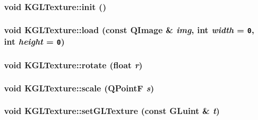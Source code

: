 \hypertarget{class_k_g_l_texture_8ce2976f7a178e059436696412b58d24}{
\subsubsection[{init}]{\setlength{\rightskip}{0pt plus 5cm}void KGLTexture::init ()}}
\label{class_k_g_l_texture_8ce2976f7a178e059436696412b58d24}


\hypertarget{class_k_g_l_texture_7526a64329b83b21af1908860a9f1c0d}{
\subsubsection[{load}]{\setlength{\rightskip}{0pt plus 5cm}void KGLTexture::load (const QImage \& {\em img}, \/  int {\em width} = {\tt 0}, \/  int {\em height} = {\tt 0})}}
\label{class_k_g_l_texture_7526a64329b83b21af1908860a9f1c0d}


\hypertarget{class_k_g_l_texture_638e961fda83c028eb6b9295d1298fdc}{
\subsubsection[{rotate}]{\setlength{\rightskip}{0pt plus 5cm}void KGLTexture::rotate (float {\em r})}}
\label{class_k_g_l_texture_638e961fda83c028eb6b9295d1298fdc}


\hypertarget{class_k_g_l_texture_4a7059c7c0001c7d758b9bbb91d71525}{
\subsubsection[{scale}]{\setlength{\rightskip}{0pt plus 5cm}void KGLTexture::scale (QPointF {\em s})}}
\label{class_k_g_l_texture_4a7059c7c0001c7d758b9bbb91d71525}


\hypertarget{class_k_g_l_texture_4f144c01153ec97b0a7e4f457ebe8f06}{
\subsubsection[{setGLTexture}]{\setlength{\rightskip}{0pt plus 5cm}void KGLTexture::setGLTexture (const GLuint \& {\em t})}}
\label{class_k_g_l_texture_4f144c01153ec97b0a7e4f457ebe8f06}


